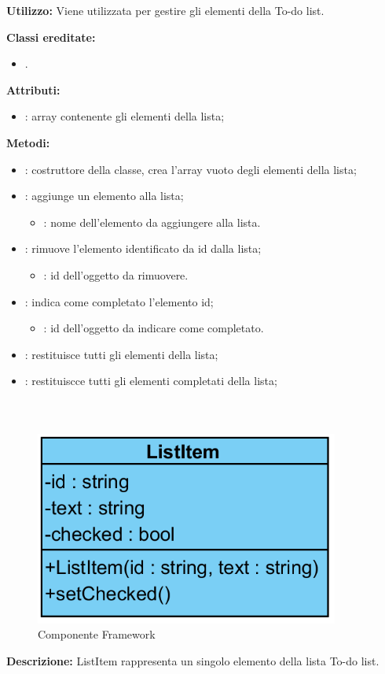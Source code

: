 \textbf{Utilizzo:}
Viene utilizzata per gestire gli elementi della To-do list.

\textbf{Classi ereditate:}
\begin{itemize}
	\item {}.
\end{itemize}

\textbf{Attributi:}
\begin{itemize}
	\item {}: array contenente gli elementi della lista;
\end{itemize}

\textbf{Metodi:}
\begin{itemize}
	\item {}: costruttore della classe, crea l'array vuoto degli elementi della lista;
	\item {}: aggiunge un elemento alla lista;
	\begin{itemize}
		\item {}: nome dell'elemento da aggiungere alla lista.
	\end{itemize}
	\item {}: rimuove l'elemento identificato da id dalla lista;
	\begin{itemize}
		\item {}: id dell'oggetto da rimuovere.
	\end{itemize}
	\item {}: indica come completato l'elemento id;
	\begin{itemize}
		\item {}: id dell'oggetto da indicare come completato.
	\end{itemize}
	\item {}: restituisce tutti gli elementi della lista;
	\item {}: restituiscce tutti gli elementi completati della lista;
\end{itemize}

\subparagraph[::ListItem]{\class}\mbox{}\\ \label{\class}
\begin{figure}[H]
	\centering
	\includegraphics[width=10cm]{./diagrammi/todo/list_item.png}
	\caption{Componente Framework}
\end{figure}
\textbf{Descrizione:}
ListItem rappresenta un singolo elemento della lista To-do list.

